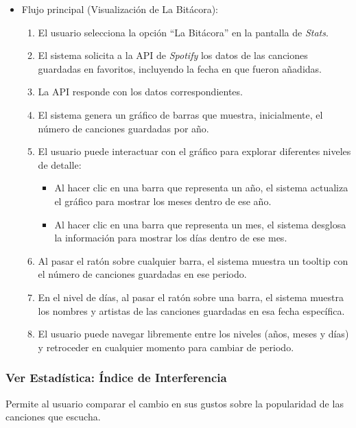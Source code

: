 \begin{itemize}
    \item Flujo principal (Visualización de La Bitácora):
          \begin{enumerate}
              \item El usuario selecciona la opción ``La Bitácora'' en la pantalla de \textit{Stats}.
              \item El sistema solicita a la API de \textit{Spotify} los datos de las canciones guardadas en favoritos, incluyendo la fecha en que fueron añadidas.
              \item La API responde con los datos correspondientes.
              \item El sistema genera un gráfico de barras que muestra, inicialmente, el número de canciones guardadas por año.
              \item El usuario puede interactuar con el gráfico para explorar diferentes niveles de detalle:
                    \begin{itemize}
                        \item Al hacer clic en una barra que representa un año, el sistema actualiza el gráfico para mostrar los meses dentro de ese año.
                        \item Al hacer clic en una barra que representa un mes, el sistema desglosa la información para mostrar los días dentro de ese mes.
                    \end{itemize}
              \item Al pasar el ratón sobre cualquier barra, el sistema muestra un tooltip con el número de canciones guardadas en ese periodo.
              \item En el nivel de días, al pasar el ratón sobre una barra, el sistema muestra los nombres y artistas de las canciones guardadas en esa fecha específica.
              \item El usuario puede navegar libremente entre los niveles (años, meses y días) y retroceder en cualquier momento para cambiar de periodo.
          \end{enumerate}
\end{itemize}

\subsubsection*{Ver Estadística: Índice de Interferencia}

Permite al usuario comparar el cambio en sus gustos sobre la popularidad de las canciones que escucha.

